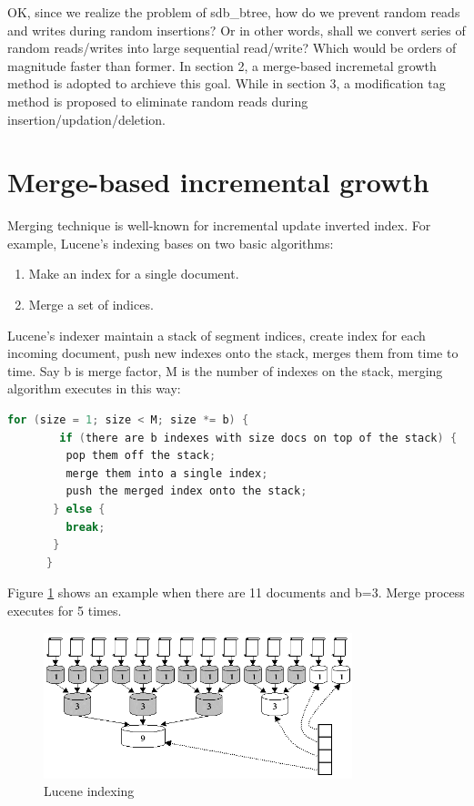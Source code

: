 \documentclass[a4paper,10pt]{article}
\begin{document}
OK, since we realize the problem of sdb\_btree, how do we prevent random reads and writes during random insertions? Or in other words, shall we convert series of random reads/writes into large sequential read/write?
Which would be orders of magnitude faster than former. In section 2, a merge-based incremetal growth method is adopted to archieve this goal.
While in section 3, a modification tag method is proposed to eliminate random reads during insertion/updation/deletion.

\section{Merge-based incremental growth}

Merging technique is well-known for incremental update inverted index. For example, Lucene's indexing bases on two basic algorithms:
\begin{enumerate}
\item Make an index for a single document.
\item Merge a set of indices.
\end{enumerate}
Lucene's indexer maintain a stack of segment indices, create index for each incoming document, push new indexes onto the stack, merges them from time to time.
Say b is merge factor, M is the number of indexes on the stack, merging algorithm executes in this way:
\begin{lstlisting}[language=C]
      for (size = 1; size < M; size *= b) {
        if (there are b indexes with size docs on top of the stack) {
         pop them off the stack;
         merge them into a single index;
         push the merged index onto the stack;
       } else {
         break;
       }
      } 
\end{lstlisting}
Figure \ref{fig:indexing} shows an example when there are 11 documents and b=3. Merge process executes for 5 times.

\begin{figure}[H]\centering
\includegraphics[width=0.8\textwidth]{indexing.png}
\caption{Lucene indexing}\label{fig:indexing}
\end{figure}
\end{document}
